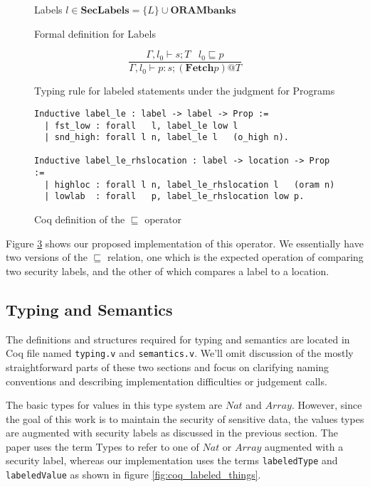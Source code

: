 \documentclass[10pt,  onecolumn]{article}
\begin{document}
\begin{figure}
\caption{Formal definition for Labels}
\label{fig:mto_labeldef}
	\begin{mdframed}
	Labels $l \in \textbf{SecLabels} = \{L\} \cup \textbf{ORAMbanks}$
	\end{mdframed}
\end{figure}

\begin{figure}
\caption{ Typing rule for labeled statements under the judgment for Programs}
\label{fig:mto_rule_statement}
\[
\frac{ \Gamma, l_{0} \vdash s;T \;\;\; l_{0} \sqsubseteq p }
	{ \Gamma, l_{0} \vdash p:s;(\textbf{Fetch} p)@T}
\]
\end{figure}

\begin{figure}
\caption{ Coq definition of the $\sqsubseteq$ operator }
\label{fig:coq_label_le}
\begin{lstlisting}
Inductive label_le : label -> label -> Prop :=
  | fst_low : forall   l, label_le low l
  | snd_high: forall l n, label_le l   (o_high n).

Inductive label_le_rhslocation : label -> location -> Prop :=
  | highloc : forall l n, label_le_rhslocation l   (oram n)
  | lowlab  : forall   p, label_le_rhslocation low p.
\end{lstlisting}

\end{figure}

Figure \ref{fig:coq_label_le} shows our proposed implementation of this operator.
We essentially have two versions of the $\sqsubseteq$ relation, one which is the expected operation of comparing two security labels, and the other of which compares a label to a location.




\subsection{ Typing and Semantics }

The definitions and structures required for typing and semantics are located in Coq file named \texttt{typing.v} and \texttt{semantics.v}.
We'll omit discussion of the mostly straightforward parts of these two sections and focus on clarifying naming conventions and describing implementation difficulties or judgement calls.

The basic types for values in this type system are $Nat$ and $Array$.
However, since the goal of this work is to maintain the security of sensitive data, the values types are augmented with security labels as discussed in the previous section.
The paper uses the term Types to refer to one of $Nat$ or $Array$ augmented with a security label, whereas our implementation uses the terms \texttt{labeledType} and \texttt{labeledValue} as shown in figure \ref{fig:coq_labeled_things}.
\end{document}
